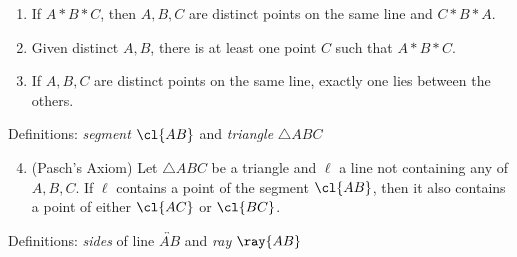 \begin{minipage}[t]{0.48\linewidth}
	\begin{enumerate}
		\item[O-1] If $A*B*C$, then $A,B,C$ are distinct points on the same line and $C*B*A$.
		\item[O-2] Given distinct $A,B$, there is at least one point $C$ such that $A*B*C$.
		\item[O-3] If $A,B,C$ are distinct points on the same line, exactly one lies between the others.
	\end{enumerate}\vspace{-2pt}
		
	Definitions: \emph{segment} $\cl{AB}$ and \emph{triangle} $\triangle ABC$\vspace{-2pt}
	
	\begin{enumerate}\setcounter{enumi}{3}	
		\item[O-4] (Pasch's Axiom) Let $\triangle ABC$ be a triangle and $\ell$ a line not containing any of $A,B,C$. If $\ell$ contains a point of the segment $\cl{AB}$, then it also contains a point of either $\cl{AC}$ or $\cl{BC}$. 
	\end{enumerate}
	
	Definitions: \emph{sides} of line $\overleftrightarrow{AB}$ and \emph{ray} $\ray{AB}$
\end{minipage}
\hfill
